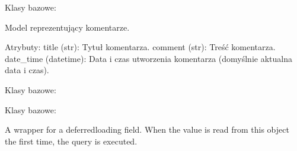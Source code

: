 \documentclass[letterpaper,11pt,polish]{sphinxmanual}
\begin{document}
\begin{fulllineitems}
\label{\detokenize{mainApp:mainApp.models.Comment}}
\pysigstartsignatures
{}
\pysigstopsignatures
\sphinxAtStartPar
Klasy bazowe: 

\sphinxAtStartPar
Model reprezentujący komentarze.

\sphinxAtStartPar
Atrybuty:
\sphinxhyphen{} title (str): Tytuł komentarza.
\sphinxhyphen{} comment (str): Treść komentarza.
\sphinxhyphen{} date\_time (datetime): Data i czas utworzenia komentarza (domyślnie aktualna data i czas).

\begin{fulllineitems}
\label{\detokenize{mainApp:mainApp.models.Comment.DoesNotExist}}
\pysigstartsignatures
{}
\pysigstopsignatures
\sphinxAtStartPar
Klasy bazowe: 

\end{fulllineitems}


\begin{fulllineitems}
\label{\detokenize{mainApp:mainApp.models.Comment.MultipleObjectsReturned}}
\pysigstartsignatures
{}
\pysigstopsignatures
\sphinxAtStartPar
Klasy bazowe: 

\end{fulllineitems}


\begin{fulllineitems}
\label{\detokenize{mainApp:mainApp.models.Comment.comment}}
\pysigstartsignatures
{}
\pysigstopsignatures
\sphinxAtStartPar
A wrapper for a deferred\sphinxhyphen{}loading field. When the value is read from this
object the first time, the query is executed.


\end{fulllineitems}
\end{fulllineitems}
\end{document}
